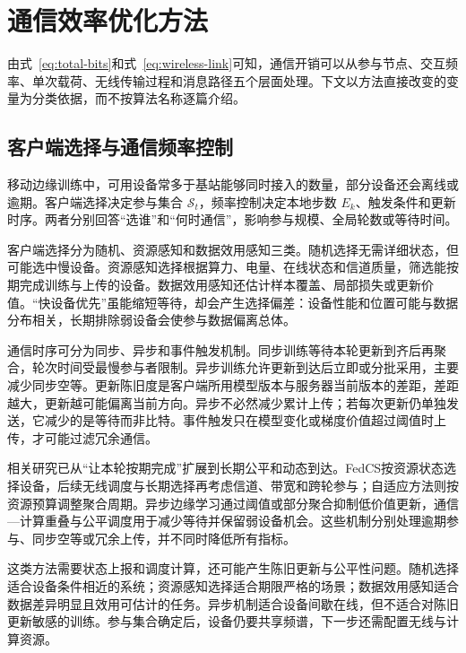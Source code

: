 \section{通信效率优化方法}\label{sec:methods}

由式~\eqref{eq:total-bits}和式~\eqref{eq:wireless-link}可知，通信开销可以从参与节点、交互频率、单次载荷、无线传输过程和消息路径五个层面处理。下文以方法直接改变的变量为分类依据，而不按算法名称逐篇介绍。

\subsection{客户端选择与通信频率控制}\label{subsec:selection-frequency}

移动边缘训练中，可用设备常多于基站能够同时接入的数量，部分设备还会离线或逾期。客户端选择决定参与集合 \(\mathcal S_t\)，频率控制决定本地步数 \(E_k\)、触发条件和更新时序。两者分别回答“选谁”和“何时通信”，影响参与规模、全局轮数或等待时间。

客户端选择分为随机、资源感知和数据效用感知三类。随机选择无需详细状态，但可能选中慢设备。资源感知选择根据算力、电量、在线状态和信道质量，筛选能按期完成训练与上传的设备。数据效用感知还估计样本覆盖、局部损失或更新价值\cite{Nishio2019FedCS,Yang2020Scheduling,Xu2021ClientBandwidth,Zhang2024ClientSelectionSurvey}。“快设备优先”虽能缩短等待，却会产生选择偏差：设备性能和位置可能与数据分布相关，长期排除弱设备会使参与数据偏离总体。

通信时序可分为同步、异步和事件触发机制。同步训练等待本轮更新到齐后再聚合，轮次时间受最慢参与者限制。异步训练允许更新到达后立即或分批采用，主要减少同步空等。更新陈旧度是客户端所用模型版本与服务器当前版本的差距，差距越大，更新越可能偏离当前方向。异步不必然减少累计上传；若每次更新仍单独发送，它减少的是等待而非比特。事件触发只在模型变化或梯度价值超过阈值时上传，才可能过滤冗余通信\cite{Lu2020EAFLM,Liu2021AsyncFL}。

相关研究已从“让本轮按期完成”扩展到长期公平和动态到达。FedCS按资源状态选择设备，后续无线调度与长期选择再考虑信道、带宽和跨轮参与；自适应方法则按资源预算调整聚合周期\cite{Nishio2019FedCS,Yang2020Scheduling,Xu2021ClientBandwidth,McMahan2017FedAvg,Wang2019AdaptiveFL}。异步边缘学习通过阈值或部分聚合抑制低价值更新，通信—计算重叠与公平调度用于减少等待并保留弱设备机会\cite{Lu2020EAFLM,Liu2021AsyncFL,Ozfatura2021FedTOE}。这些机制分别处理逾期参与、同步空等或冗余上传，并不同时降低所有指标。

这类方法需要状态上报和调度计算，还可能产生陈旧更新与公平性问题。随机选择适合设备条件相近的系统；资源感知选择适合期限严格的场景；数据效用感知适合数据差异明显且效用可估计的任务。异步机制适合设备间歇在线，但不适合对陈旧更新敏感的训练。参与集合确定后，设备仍要共享频谱，下一步还需配置无线与计算资源。

